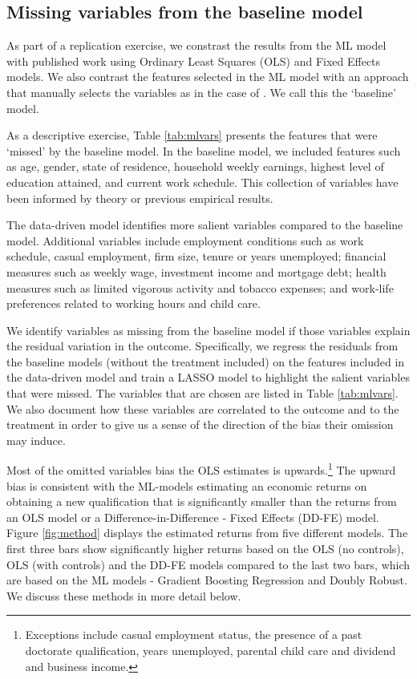 \documentclass[12pt, a4paper]{article}
\begin{document}
\subsection{Missing variables from the baseline model}

As part of a replication exercise, we constrast the results from the ML model with published work using Ordinary Least Squares (OLS) and Fixed Effects models. We also contrast the features selected in the ML model with an approach that manually selects the variables as in the case of \cite{chesters2015}. We call this the `baseline' model.

As a descriptive exercise, Table \ref{tab:mlvars} presents the features that were `missed' by the baseline model. In the baseline model, we included features such as age, gender, state of residence, household weekly earnings, highest level of education attained, and current work schedule. This collection of variables have been informed by theory or previous empirical results.  

The data-driven model identifies more salient variables compared to the baseline model. Additional variables include employment conditions such as work schedule, casual employment, firm size, tenure or years unemployed; financial measures such as weekly wage, investment income and mortgage debt; health measures such as limited vigorous activity and tobacco expenses; and work-life preferences related to working hours and child care. 

We identify variables as missing from the baseline model if those variables explain the residual variation in the outcome. Specifically, we regress the residuals from the baseline models (without the treatment included) on the features included in the data-driven model and train a LASSO model to highlight the salient variables that were missed. The variables that are chosen are listed in Table \ref{tab:mlvars}. We also document how these variables are correlated to the outcome and to the treatment in order to give us a sense of the direction of the bias their omission may induce. 

Most of the omitted variables bias the OLS estimates is upwards.\footnote{Exceptions include casual employment status, the presence of a past doctorate qualification, years unemployed, parental child care and dividend and business income.} The upward bias is consistent with the ML-models estimating an economic returns on obtaining a new qualification that is significantly smaller than the returns from an OLS model or a Difference-in-Difference - Fixed Effects (DD-FE)  model. Figure \ref{fig:method} displays the estimated returns from five different models. The first three bars show significantly higher returns based on the OLS (no controls), OLS (with controls) and the DD-FE models compared to the last two bars, which are based on the ML models - Gradient Boosting Regression and Doubly Robust. We discuss these methods in more detail below. 
\end{document}
